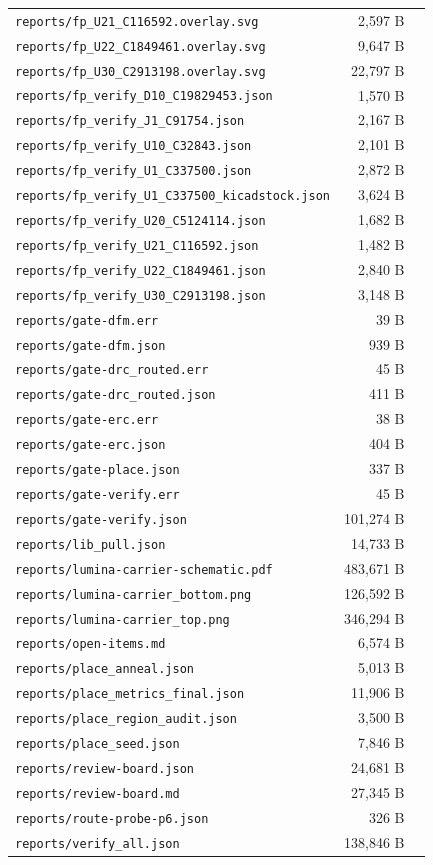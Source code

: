 \documentclass[11pt,a4paper]{article}
\begin{document}
{\begin{longtable}{p{9cm}rp{4cm}}
\texttt{reports/fp\_U21\_C116592.overlay.svg} & 2,597 B &  \\
\texttt{reports/fp\_U22\_C1849461.overlay.svg} & 9,647 B &  \\
\texttt{reports/fp\_U30\_C2913198.overlay.svg} & 22,797 B &  \\
\texttt{reports/fp\_verify\_D10\_C19829453.json} & 1,570 B &  \\
\texttt{reports/fp\_verify\_J1\_C91754.json} & 2,167 B &  \\
\texttt{reports/fp\_verify\_U10\_C32843.json} & 2,101 B &  \\
\texttt{reports/fp\_verify\_U1\_C337500.json} & 2,872 B &  \\
\texttt{reports/fp\_verify\_U1\_C337500\_kicadstock.json} & 3,624 B &  \\
\texttt{reports/fp\_verify\_U20\_C5124114.json} & 1,682 B &  \\
\texttt{reports/fp\_verify\_U21\_C116592.json} & 1,482 B &  \\
\texttt{reports/fp\_verify\_U22\_C1849461.json} & 2,840 B &  \\
\texttt{reports/fp\_verify\_U30\_C2913198.json} & 3,148 B &  \\
\texttt{reports/gate-dfm.err} & 39 B &  \\
\texttt{reports/gate-dfm.json} & 939 B &  \\
\texttt{reports/gate-drc\_routed.err} & 45 B &  \\
\texttt{reports/gate-drc\_routed.json} & 411 B &  \\
\texttt{reports/gate-erc.err} & 38 B &  \\
\texttt{reports/gate-erc.json} & 404 B &  \\
\texttt{reports/gate-place.json} & 337 B &  \\
\texttt{reports/gate-verify.err} & 45 B &  \\
\texttt{reports/gate-verify.json} & 101,274 B &  \\
\texttt{reports/lib\_pull.json} & 14,733 B &  \\
\texttt{reports/lumina-carrier-schematic.pdf} & 483,671 B &  \\
\texttt{reports/lumina-carrier\_bottom.png} & 126,592 B &  \\
\texttt{reports/lumina-carrier\_top.png} & 346,294 B &  \\
\texttt{reports/open-items.md} & 6,574 B &  \\
\texttt{reports/place\_anneal.json} & 5,013 B &  \\
\texttt{reports/place\_metrics\_final.json} & 11,906 B &  \\
\texttt{reports/place\_region\_audit.json} & 3,500 B &  \\
\texttt{reports/place\_seed.json} & 7,846 B &  \\
\texttt{reports/review-board.json} & 24,681 B &  \\
\texttt{reports/review-board.md} & 27,345 B &  \\
\texttt{reports/route-probe-p6.json} & 326 B &  \\
\texttt{reports/verify\_all.json} & 138,846 B &  \\
\bottomrule
\end{longtable}
}
\end{document}
